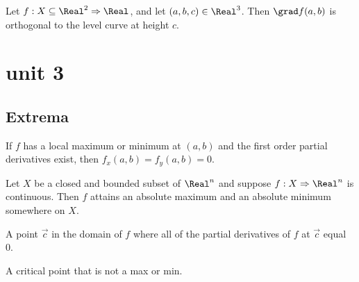 \begin{theorem}
  Let $f : X \subseteq \Real^2 \Rightarrow \Real$, and let $(a, b, c) \in \Real^3$. Then $\grad f(a, b)$ is orthogonal to the level curve at height $c$.
\end{theorem}

\section{unit 3}

\subsection{Extrema}

\begin{theorem}
  If $f$ has a local maximum or minimum at $(a, b)$ and the first order partial derivatives exist, then $f_x(a, b) = f_y(a, b) = 0$.
\end{theorem}

\begin{namedtheorem}
  Let $X$ be a closed and bounded subset of $\Real^n$ and suppose $f : X \Rightarrow \Real^n$ is continuous. Then $f$ attains an absolute maximum and an absolute minimum somewhere on $X$.
\end{namedtheorem}

\begin{definition}
  A point $\vec{c}$ in the domain of $f$ where all of the partial derivatives of $f$ at $\vec{c}$ equal 0.
\end{definition}

\begin{definition}
  A critical point that is not a max or min.
\end{definition}

